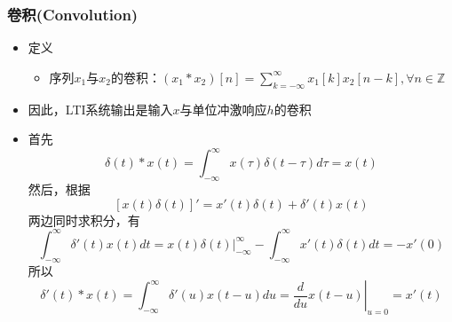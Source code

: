 \documentclass[CJKutf8,dvipsnames,table]{beamer}
\newif\ifxetexorluatex %
\begin{document}
\begin{CJK*}{UTF8}{song}
  \begin{frame}
    \frametitle{卷积(Convolution)}
    \begin{itemize}
    \item 定义
        \begin{itemize}
        \item 序列$x_1$与$x_2$的卷积：$(x_1*x_2)[n]=\sum_{k=-\infty}^{\infty}x_1[k]x_2[n-k], \forall n \in \mathbb{Z}$
        \end{itemize}   
    \item 因此，LTI系统输出是输入$x$与单位冲激响应$h$的卷积
    \item 首先
    \[
    	\delta(t) \ast x(t) = \int_{-\infty}^{\infty} x(\tau) \delta(t - \tau)d\tau = x(t)
    \]
    然后，根据
    \[
    	[x(t)\delta(t)]' = x'(t)\delta(t) + \delta'(t)x(t) 
	\]
	两边同时求积分，有
	\[
    	\int_{-\infty}^{\infty} \delta'(t)x(t) dt = \left. x(t)\delta(t) \right\vert_{-\infty}^{\infty} - \int_{-\infty}^{\infty} x'(t)\delta(t) dt = -x'(0)
    \]
	所以	
    \[
		\delta'(t) \ast x(t) = \int_{-\infty}^{\infty} \delta'(u)x(t-u) du = \left. \frac{d}{du}x(t-u) \right\vert_{u=0} = x'(t)
	\]
    \end{itemize} 
  \end{frame}     
    
\ifxetexorluatex\else
\end{CJK*}
\fi
\end{document}
